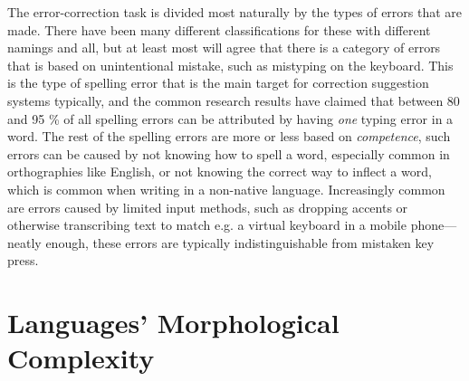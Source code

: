 \documentclass[officiallayout,draft]{unihelcompling}
\begin{document}
The error-correction task is divided most naturally by the types of errors that
are made. There have been many different classifications for these with
different namings and all, but at least most will agree that there is a
category of errors that is based on unintentional mistake, such as
mistyping on the keyboard. This is the type of spelling error that is the
main target for correction suggestion systems typically, and the common
research results have claimed that between 80 and 95 \% of all spelling
errors can be attributed by having \emph{one} typing error in a 
word\citep{kukich1992techniques}. The rest of the spelling errors are more
or less based on \emph{competence}, such errors can be caused by not knowing
how to spell a word, especially common in orthographies like English, or not
knowing the correct way to inflect a word, which is common when writing in a
non-native language. Increasingly common are errors caused by limited input
methods, such as dropping accents or otherwise transcribing text to match e.g.
a virtual keyboard in a mobile phone---neatly enough, these errors are 
typically indistinguishable from mistaken key press.



\section{Languages' Morphological Complexity}
\label{sec:morphological-complexity}
\end{document}
